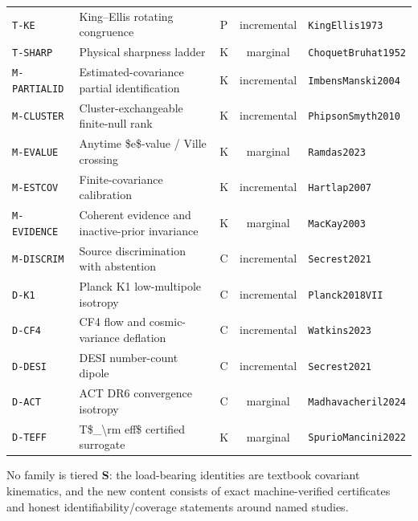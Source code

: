 \documentclass[11pt]{article}
\newcommand{\code}[1]{\texttt{#1}}
\begin{document}
\begin{center}
\begin{longtable}{llccl}
\code{T-KE} & King--Ellis rotating congruence & P & incremental & \code{KingEllis1973} \\
\code{T-SHARP} & Physical sharpness ladder & K & marginal & \code{ChoquetBruhat1952} \\
\code{M-PARTIALID} & Estimated-covariance partial identification & K & incremental & \code{ImbensManski2004} \\
\code{M-CLUSTER} & Cluster-exchangeable finite-null rank & K & incremental & \code{PhipsonSmyth2010} \\
\code{M-EVALUE} & Anytime \$e\$-value / Ville crossing & K & marginal & \code{Ramdas2023} \\
\code{M-ESTCOV} & Finite-covariance calibration & K & incremental & \code{Hartlap2007} \\
\code{M-EVIDENCE} & Coherent evidence and inactive-prior invariance & K & marginal & \code{MacKay2003} \\
\code{M-DISCRIM} & Source discrimination with abstention & C & incremental & \code{Secrest2021} \\
\code{D-K1} & Planck K1 low-multipole isotropy & C & incremental & \code{Planck2018VII} \\
\code{D-CF4} & CF4 flow and cosmic-variance deflation & C & incremental & \code{Watkins2023} \\
\code{D-DESI} & DESI number-count dipole & C & incremental & \code{Secrest2021} \\
\code{D-ACT} & ACT DR6 convergence isotropy & C & marginal & \code{Madhavacheril2024} \\
\code{D-TEFF} & T\$\_{\textbackslash{}rm eff}\$ certified surrogate & K & marginal & \code{SpurioMancini2022} \\
\bottomrule
\end{longtable}
\end{center}
No family is tiered \textbf{S}: the load-bearing identities are textbook covariant
kinematics, and the new content consists of exact machine-verified certificates
and honest identifiability/coverage statements around named studies.
\end{document}
